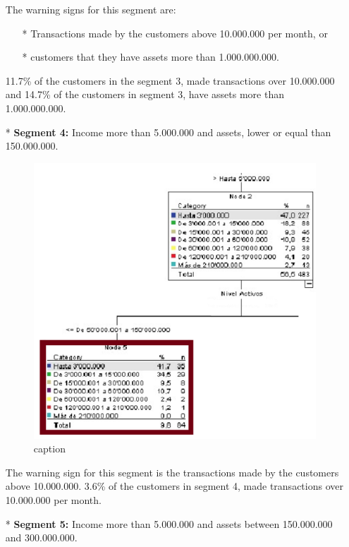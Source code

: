 \begin{itemize}
\begin{figure}[ht!]
\end{figure}

The warning signs for this segment are: \begin{itemize}
\item[*] Transactions made by the customers above 10.000.000 per month, or
\item[*] customers that they have assets more than 1.000.000.000.
\end{itemize}
11.7\% of the customers in the segment 3, made transactions over 10.000.000 and 14.7\% of the customers in segment 3, have assets more than 1.000.000.000.
\item[*] \textbf{Segment 4:}
Income more than 5.000.000 and assets, lower or equal than 150.000.000.
\begin{figure}[ht!]
  \centering
  \includegraphics[scale=0.35]{Segmento4}
  \caption{caption}
\end{figure}
The warning sign for this segment is the transactions made by the customers above 10.000.000.  3.6\% of the customers in segment 4, made transactions over 10.000.000 per month.\newpage
\item[*] \textbf{Segment 5:}
Income more than 5.000.000 and assets between 150.000.000 and 300.000.000.
\begin{figure}[ht!]
  \centering

\end{figure}
\end{itemize}

